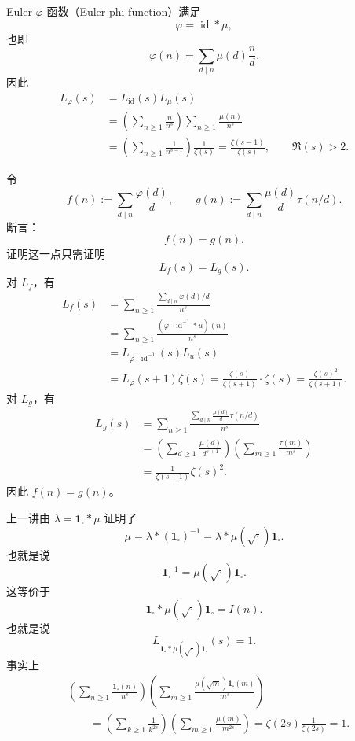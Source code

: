 \begin{example}
	Euler $\varphi$-函数（Euler phi function）满足
	\[
		\varphi=\operatorname{id}*\mu,
	\]
	也即
	\[
		\varphi(n)=\sum_{d\mid n}\mu(d)\frac{n}{d}.
	\]
	因此
	\[
	\begin{aligned}
		L_\varphi(s)
		&=
		L_{\operatorname{id}}(s)L_\mu(s)\\
		&=
		\left(\sum_{n\geq 1}\frac{n}{n^s}\right)
		\sum_{n\geq 1}\frac{\mu(n)}{n^s}\\
		&=
		\left(\sum_{n\geq 1}\frac1{n^{s-1}}\right)
		\frac1{\zeta(s)}
		=
		\frac{\zeta(s-1)}{\zeta(s)},
		\qquad \Re(s)>2.
	\end{aligned}
	\]
\end{example}

\begin{example}
	令
	\[
		f(n):=\sum_{d\mid n}\frac{\varphi(d)}{d},
		\qquad
		g(n):=\sum_{d\mid n}\frac{\mu(d)}{d}\tau(n/d).
	\]
	断言：
	\[
		f(n)=g(n).
	\]
	证明这一点只需证明
	\[
		L_f(s)=L_g(s).
	\]
	对 $L_f$，有
	\[
	\begin{aligned}
		L_f(s)
		&=
		\sum_{n\geq 1}
		\frac{\sum_{d\mid n}\varphi(d)/d}{n^s}\\
		&=
		\sum_{n\geq 1}
		\frac{(\varphi\cdot\operatorname{id}^{-1}*u)(n)}{n^s}\\
		&=
		L_{\varphi\cdot\operatorname{id}^{-1}}(s)L_u(s)\\
		&=
		L_\varphi(s+1)\zeta(s)
		=
		\frac{\zeta(s)}{\zeta(s+1)}\cdot\zeta(s)
		=
		\frac{\zeta(s)^2}{\zeta(s+1)}.
	\end{aligned}
	\]
	对 $L_g$，有
	\[
	\begin{aligned}
		L_g(s)
		&=
		\sum_{n\geq 1}
		\frac{\sum_{d\mid n}\frac{\mu(d)}d\tau(n/d)}{n^s}\\
		&=
		\left(\sum_{d\geq 1}\frac{\mu(d)}{d^{s+1}}\right)
		\left(\sum_{m\geq 1}\frac{\tau(m)}{m^s}\right)\\
		&=
		\frac1{\zeta(s+1)}\zeta(s)^2.
	\end{aligned}
	\]
	因此 $f(n)=g(n)$。
\end{example}

\begin{example}
	上一讲由 $\lambda=\mathbf 1_{\square}*\mu$ 证明了
	\[
		\mu
		=
		\lambda*(\mathbf 1_{\square})^{-1}
		=
		\lambda*\mu(\sqrt{\cdot})\mathbf 1_{\square}.
	\]
	也就是说
	\[
		\mathbf 1_{\square}^{-1}
		=
		\mu(\sqrt{\cdot})\mathbf 1_{\square}.
	\]
	这等价于
	\[
		\mathbf 1_{\square}*
		\mu(\sqrt{\cdot})\mathbf 1_{\square}
		=
		I(n).
	\]
	也就是说
	\[
		L_{\mathbf 1_{\square}*\mu(\sqrt{\cdot})\mathbf 1_{\square}}(s)=1.
	\]
	事实上
	\[
	\begin{aligned}
		&\left(\sum_{n\geq 1}\frac{\mathbf 1_{\square}(n)}{n^s}\right)
		\left(\sum_{m\geq 1}
		\frac{\mu(\sqrt m)\mathbf 1_{\square}(m)}{m^s}\right)\\
		&\qquad=
		\left(\sum_{k\geq 1}\frac1{k^{2s}}\right)
		\left(\sum_{m\geq 1}\frac{\mu(m)}{m^{2s}}\right)
		=
		\zeta(2s)\frac1{\zeta(2s)}
		=
		1.
	\end{aligned}
	\]
\end{example}

